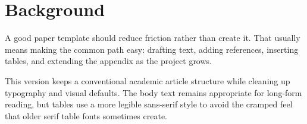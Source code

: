 \section{Background}

A good paper template should reduce friction rather than create it. That usually means making the common path easy: drafting text, adding references, inserting tables, and extending the appendix as the project grows.

This version keeps a conventional academic article structure while cleaning up typography and visual defaults. The body text remains appropriate for long-form reading, but tables use a more legible sans-serif style to avoid the cramped feel that older serif table fonts sometimes create.
